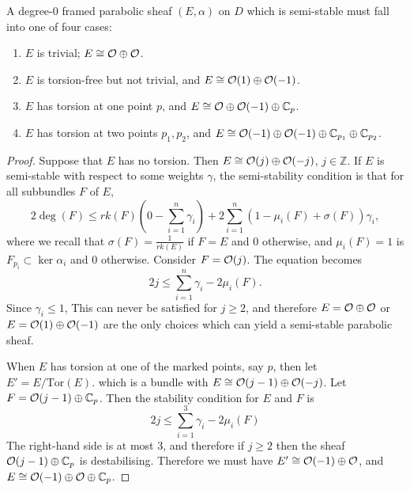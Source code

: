 	\begin{lemma}
		\label{t:four-seqs}
		A degree-0 framed parabolic sheaf $(E,\alpha)$ on $D$ which is semi-stable must fall into one of four cases:
		\begin{enumerate}
			\item $E$ is trivial; $E\cong \mathcal{O}\oplus \mathcal{O}$.
			\item $E$ is torsion-free but not trivial, and $E\cong \mathcal{O}(1)\oplus\mathcal{O}(-1)$.
			\item $E$ has torsion at one point $p$, and $E\cong \mathcal{O}\oplus\mathcal{O}(-1)\oplus \mathbb{C}_p$.
			\item $E$ has torsion at two points $p_1,p_2$, and $E\cong \mathcal{O}(-1)\oplus\mathcal{O}(-1)\oplus\mathbb{C}_{p_1}\oplus \mathbb{C}_{p_2}$.
		\end{enumerate}
	\end{lemma}
	\begin{proof}
		Suppose that $E$ has no torsion. Then $E \cong \mathcal{O}(j)\oplus \mathcal{O}(-j)$, $j\in\mathbb{Z}$. If $E$ is semi-stable with respect to some weights $\gamma$, the semi-stability condition is that for all subbundles $F$ of $E$,
		\begin{equation}
			2\deg(F) \leq rk(F)\left(
			0-\sum_{i=1}^n \gamma_i
			\right) + 2\sum_{i=1}^n(1-\mu_i(F) + \sigma(F))\gamma_i,
		\end{equation}
		where we recall that $\sigma(F) = \frac{1}{rk(E)}$ if $F=E$ and $0$ otherwise, and $\mu_i(F) = 1$ is $F_{p_i} \subset \ker \alpha_i$ and $0$ otherwise. Consider $F = \mathcal{O}(j)$. The equation becomes
		\begin{equation}
			2j \leq \sum_{i=1}^n \gamma_i - 2\mu_i(F).
		\end{equation}
		Since $\gamma_i \leq 1$, This can never be satisfied for $j \geq 2$, and therefore $E = \mathcal{O}\oplus\mathcal{O}$ or $E=\mathcal{O}(1)\oplus\mathcal{O}(-1)$ are the only choices which can yield a semi-stable parabolic sheaf. 
		
		When $E$ has torsion at one of the marked points, say $p$, then let $E' = E/\text{Tor}(E)$.
		which is a bundle with $E\cong \mathcal{O}(j-1)\oplus\mathcal{O}(-j)$. Let $F=\mathcal{O}(j-1)\oplus \mathbb{C}_p$. Then the stability condition for $E$ and $F$ is
		\begin{equation}
			2j \leq \sum_{i=1}^3 \gamma_i -2\mu_i(F)
		\end{equation}
		The right-hand side is at most 3, and therefore if $j\geq 2$ then the sheaf $\mathcal{O}(j-1)\oplus \mathbb{C}_p$ is destabilising. Therefore we must have $E' \cong \mathcal{O}(-1)\oplus \mathcal{O}$, and $E \cong \mathcal{O}(-1)\oplus \mathcal{O} \oplus \mathbb{C}_p$. 
		

\end{proof}
